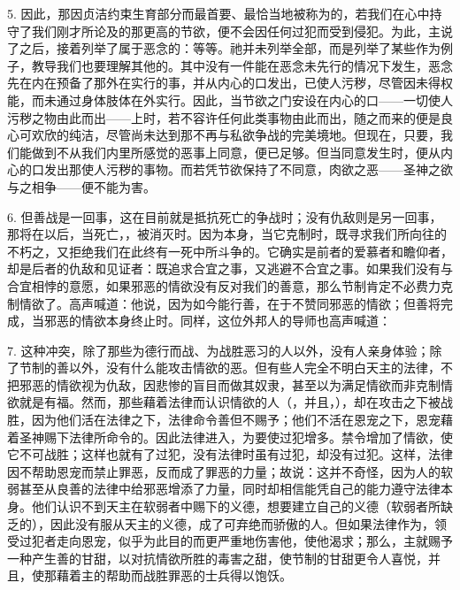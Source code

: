 5. 因此，那因贞洁约束生育部分而最首要、最恰当地被称为的，若我们在心中持守了我们刚才所论及的那更高的节欲，便不会因任何过犯而受到侵犯。为此，主说了之后，接着列举了属于恶念的：等等。祂并未列举全部，而是列举了某些作为例子，教导我们也要理解其他的。其中没有一件能在恶念未先行的情况下发生，恶念先在内在预备了那外在实行的事，并从内心的口发出，已使人污秽，尽管因未得权能，而未通过身体肢体在外实行。因此，当节欲之门安设在内心的口——一切使人污秽之物由此而出——上时，若不容许任何此类事物由此而出，随之而来的便是良心可欢欣的纯洁，尽管尚未达到那不再与私欲争战的完美境地。但现在，只要，我们能做到不从我们内里所感觉的恶事上同意，便已足够。但当同意发生时，便从内心的口发出那使人污秽的事物。而若凭节欲保持了不同意，肉欲之恶——圣神之欲与之相争——便不能为害。\par

6. 但善战是一回事，这在目前就是抵抗死亡的争战时；没有仇敌则是另一回事，那将在以后，当死亡，，被消灭时。因为本身，当它克制时，既寻求我们所向往的不朽之，又拒绝我们在此终有一死中所斗争的。它确实是前者的爱慕者和瞻仰者，却是后者的仇敌和见证者：既追求合宜之事，又逃避不合宜之事。如果我们没有与合宜相悖的意愿，如果邪恶的情欲没有反对我们的善意，那么节制肯定不必费力克制情欲了。高声喊道：他说，因为如今能行善，在于不赞同邪恶的情欲；但善将完成，当邪恶的情欲本身终止时。同样，这位外邦人的导师也高声喊道：\par

7. 这种冲突，除了那些为德行而战、为战胜恶习的人以外，没有人亲身体验；除了节制的善以外，没有什么能攻击情欲的恶。但有些人完全不明白天主的法律，不把邪恶的情欲视为仇敌，因悲惨的盲目而做其奴隶，甚至以为满足情欲而非克制情欲就是有福。然而，那些藉着法律而认识情欲的人（，并且，），却在攻击之下被战胜，因为他们活在法律之下，法律命令善但不赐予；他们不活在恩宠之下，恩宠藉着圣神赐下法律所命令的。因此法律进入，为要使过犯增多。禁令增加了情欲，使它不可战胜；这样也就有了过犯，没有法律时虽有过犯，却没有过犯。这样，法律因不帮助恩宠而禁止罪恶，反而成了罪恶的力量；故说：这并不奇怪，因为人的软弱甚至从良善的法律中给邪恶增添了力量，同时却相信能凭自己的能力遵守法律本身。他们认识不到天主在软弱者中赐下的义德，想要建立自己的义德（软弱者所缺乏的），因此没有服从天主的义德，成了可弃绝而骄傲的人。但如果法律作为，领受过犯者走向恩宠，似乎为此目的而更严重地伤害他，使他渴求；那么，主就赐予一种产生善的甘甜，以对抗情欲所胜的毒害之甜，使节制的甘甜更令人喜悦，并且，使那藉着主的帮助而战胜罪恶的士兵得以饱饫。\par

